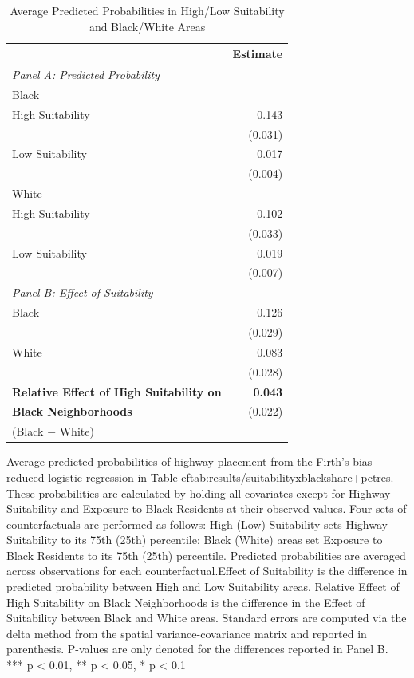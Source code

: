 \begin{table}[h]
\centering
\caption{Average Predicted Probabilities in High/Low Suitability and Black/White Areas}
\label{tab:predicted_outcomes/suitabilityxblackshare}
\begin{threeparttable}
\begin{tabular*}{1\textwidth}{@{\extracolsep{\fill}}lr@{\hspace{1.2em}}}
\toprule
 & Estimate \\
\midrule
\textit{Panel A: Predicted Probability} & \\
\addlinespace[2pt]
Black & \\
\quad High Suitability & 0.143 \\
 & (0.031) \\[4pt]
\quad Low Suitability & 0.017 \\
 & (0.004) \\[4pt]
White & \\
\quad High Suitability & 0.102 \\
 & (0.033) \\[4pt]
\quad Low Suitability & 0.019 \\
 & (0.007) \\[4pt]
\midrule
\textit{Panel B: Effect of Suitability} & \\
\addlinespace[2pt]
Black & 0.126\rlap{$^{***}$} \\
 & (0.029) \\[4pt]
White & 0.083\rlap{$^{***}$} \\
 & (0.028) \\[4pt]
\addlinespace[2pt]
\textbf{Relative Effect of High Suitability on} & \textbf{0.043}\rlap{$^{*}$} \\
\textbf{Black Neighborhoods} & (0.022) \\
(Black $-$ White) &  \\
\bottomrule
\end{tabular*}
\begin{tablenotes}[flushleft]
\footnotesize
\item Average predicted probabilities of highway placement from the Firth’s bias-reduced logistic regression in Table 
ef{tab:results/suitabilityxblackshare+pctres}. These probabilities are calculated by holding all covariates except for Highway Suitability and Exposure to Black Residents at their observed values. Four sets of counterfactuals are performed as follows:  High (Low) Suitability sets Highway Suitability to its 75th (25th) percentile; Black (White) areas set Exposure to Black Residents to its 75th (25th) percentile. Predicted probabilities are averaged across observations for each counterfactual.Effect of Suitability is the difference in predicted probability between High and Low Suitability areas. Relative Effect of High Suitability on Black Neighborhoods is the difference in the Effect of Suitability between Black and White areas. Standard errors are computed via the delta method from the spatial variance-covariance matrix and reported in parenthesis. P-values are only denoted for the differences reported in Panel B. *** p < 0.01, ** p < 0.05, * p < 0.1
\end{tablenotes}
\end{threeparttable}
\end{table}
